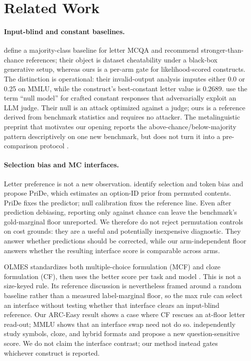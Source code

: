 \section{Related Work}

\paragraph{Input-blind and constant baselines.}
\citet{balepur2024artifacts} define a majority-class baseline for letter MCQA and recommend stronger-than-chance references; their object is dataset cheatability under a black-box generative setup, whereas ours is a per-arm gate for likelihood-scored constructs. The distinction is operational: their invalid-output analysis imputes either 0.0 or 0.25 on MMLU, while the construct's best-constant letter value is 0.2689. \citet{zheng2025cheating} use the term ``null model'' for crafted constant responses that adversarially exploit an LLM judge. Their null is an attack optimized against a judge; ours is a reference derived from benchmark statistics and requires no attacker. The metalinguistic preprint that motivates our opening reports the above-chance/below-majority pattern descriptively on one new benchmark, but does not turn it into a pre-comparison protocol \citep{arcon2026metalinguistic}.

\paragraph{Selection bias and MC interfaces.}
Letter preference is not a new observation. \citet{zheng2024selectors} identify selection and token bias and propose PriDe, which estimates an option-ID prior from permuted contents. PriDe fixes the predictor; null calibration fixes the reference line. Even after prediction debiasing, reporting only against chance can leave the benchmark's gold-marginal floor unreported. We therefore do not reject permutation controls on cost grounds: they are a useful and potentially inexpensive diagnostic. They answer whether predictions should be corrected, while our arm-independent floor answers whether the resulting interface score is comparable across arms.

OLMES standardizes both multiple-choice formulation (MCF) and cloze formulation (CF), then uses the better score per task and model \citep{gu2025olmes}. This is not a size-keyed rule. Its reference discussion is nevertheless framed around a random baseline rather than a measured label-marginal floor, so the max rule can select an interface without testing whether that interface clears an input-blind reference. Our ARC-Easy result shows a case where CF rescues an at-floor letter read-out; MMLU shows that an interface swap need not do so. \citet{cho2026choices} independently study symbols, cloze, and hybrid formats and propose a new question-sensitive score. We do not claim the interface contrast; our method instead gates whichever construct is reported.

